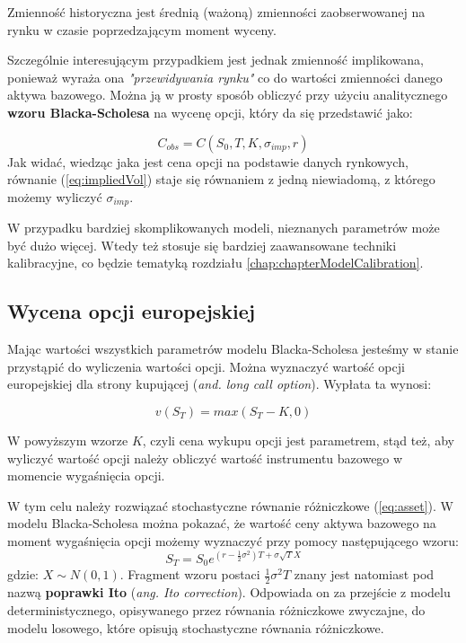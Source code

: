 \documentclass{pracamgr}
\begin{document}
Zmienność historyczna jest średnią (ważoną) zmienności zaobserwowanej na rynku w czasie 
poprzedzającym moment wyceny.

Szczególnie interesującym przypadkiem jest jednak zmienność implikowana, ponieważ 
wyraża ona \textit{"przewidywania rynku"} co do wartości zmienności danego aktywa bazowego. 
Można ją w prosty sposób obliczyć przy użyciu analitycznego \textbf{wzoru Blacka-Scholesa} na 
wycenę opcji, który da się przedstawić jako:

\begin{equation}
  \label{eq:impliedVol}
  C_{obs} = C(S_0, T, K, \sigma_{imp}, r)
\end{equation}
Jak widać, wiedząc jaka jest cena opcji na podstawie danych rynkowych, równanie (\ref{eq:impliedVol}) 
staje się równaniem z jedną niewiadomą, z którego możemy wyliczyć $\sigma_{imp}$.

W przypadku bardziej skomplikowanych modeli, nieznanych parametrów może być dużo więcej. Wtedy też 
stosuje się bardziej zaawansowane techniki kalibracyjne, co będzie tematyką 
rozdziału \ref{chap:chapterModelCalibration}.

\subsection{Wycena opcji europejskiej} %
\label{sub:subsection_name}
 
Mając wartości wszystkich parametrów modelu Blacka-Scholesa jesteśmy w stanie przystąpić
do wyliczenia wartości opcji. Można wyznaczyć wartość opcji europejskiej dla 
strony kupującej (\textit{and. long call option}). Wypłata ta wynosi:

\begin{equation}
  v(S_T) = max(S_T-K, 0)
\end{equation}

W powyższym wzorze $K$, czyli cena wykupu opcji jest parametrem, stąd też, aby 
wyliczyć wartość opcji należy obliczyć wartość instrumentu bazowego w momencie wygaśnięcia opcji.

W tym celu należy rozwiązać stochastyczne równanie różniczkowe (\ref{eq:asset}). W modelu Blacka-Scholesa
można pokazać, że wartość ceny aktywa bazowego na moment wygaśnięcia opcji możemy wyznaczyć przy pomocy
następującego wzoru:
\begin{equation}
\label{eq:closedFormBlack} 
  S_T = S_0 e^{(r - \frac{1}{2} \sigma^2)T+\sigma \sqrt{T} X}
\end{equation}
gdzie: $X \sim N(0,1)$.
Fragment wzoru postaci $\frac{1}{2} \sigma^2 T$ znany jest natomiast pod 
nazwą \textbf{poprawki Ito} (\textit{ang. Ito correction}).
Odpowiada on za przejście z modelu deterministycznego, opisywanego przez równania różniczkowe
zwyczajne, do modelu losowego, które opisują stochastyczne równania różniczkowe.
\end{document}
